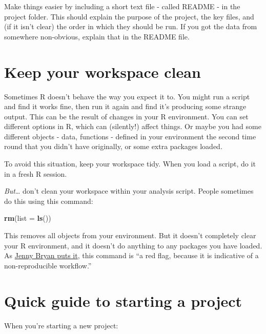 \documentclass[]{book}
\newenvironment{Shaded}{\begin{snugshade}}{\end{snugshade}}
\newcommand{\DataTypeTok}[1]{\textcolor[rgb]{0.13,0.29,0.53}{#1}}
\newcommand{\KeywordTok}[1]{\textcolor[rgb]{0.13,0.29,0.53}{\textbf{#1}}}
\newcommand{\NormalTok}[1]{#1}
\begin{document}
Make things easier by including a short text file - called README - in the project folder. This should explain the purpose of the project, the key files, and (if it isn't clear) the order in which they should be run. If you got the data from somewhere non-obvious, explain that in the README file.

\hypertarget{clean-workspace}{%
\section{Keep your workspace clean}\label{clean-workspace}}

Sometimes R doesn't behave the way you expect it to. You might run a script and find it works fine, then run it again and find it's producing some strange output. This can be the result of changes in your R environment. You can set different options in R, which can (silently!) affect things. Or maybe you had some different objects - data, functions - defined in your environment the second time round that you didn't have originally, or some extra packages loaded.

To avoid this situation, keep your workspace tidy. When you load a script, do it in a fresh R session.

\emph{But}\ldots{} don't clean your workspace within your analysis script. People sometimes do this using this command:

\begin{Shaded}
\begin{Highlighting}[]
\KeywordTok{rm}\NormalTok{(}\DataTypeTok{list =} \KeywordTok{ls}\NormalTok{())}
\end{Highlighting}
\end{Shaded}

This removes all objects from your environment. But it doesn't completely clear your R environment, and it doesn't do anything to any packages you have loaded. As \href{https://rstats.wtf/save-source.html\#rm-list-ls}{Jenny Bryan puts it}, this command is ``a red flag, because it is indicative of a non-reproducible workflow.''

\hypertarget{quick-guide}{%
\section{Quick guide to starting a project}\label{quick-guide}}

When you're starting a new project:
\end{document}
